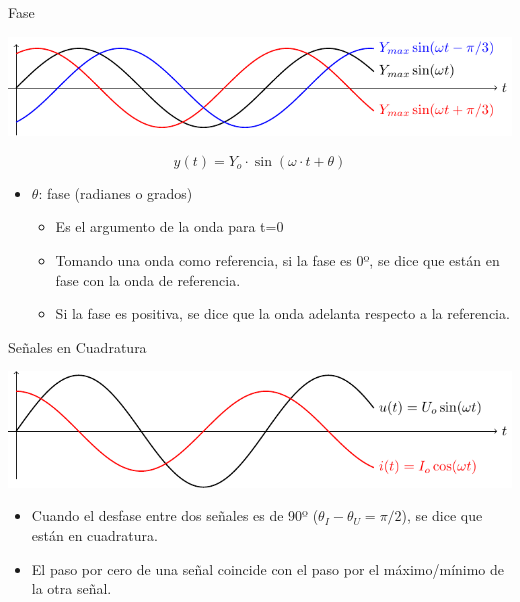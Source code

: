 \documentclass[aspectratio=169, usenames,svgnames,dvipsnames]{beamer}
\begin{document}
\begin{frame}[label={sec:org0d32d6c}]{Fase}
\begin{center}
\includegraphics[width=.9\linewidth]{../figs/desfase.pdf}
\end{center}


\[
y(t)=Y_{o}\cdot\sin(\omega\cdot t+\theta)
\]

\begin{itemize}
\item \(\theta\): fase (radianes o grados)

\begin{itemize}
\item Es el argumento de la onda para t=0

\item Tomando una onda como referencia, si la fase es 0º, se dice que
están en fase con la onda de referencia.

\item Si la fase es positiva, se dice que la onda adelanta
respecto a la referencia.
\end{itemize}
\end{itemize}
\end{frame}


\begin{frame}[label={sec:org0683624}]{Señales en Cuadratura}
\begin{center}
\includegraphics[width=.9\linewidth]{../figs/cuadratura.pdf}
\end{center}

\begin{itemize}
\item Cuando el desfase entre dos señales es de 90º (\(\theta_I - \theta_U = \pi/2\)), se dice que están en cuadratura.
\item El paso por cero de una señal coincide con el paso por el máximo/mínimo de la otra señal.
\end{itemize}
\end{frame}
\end{document}
